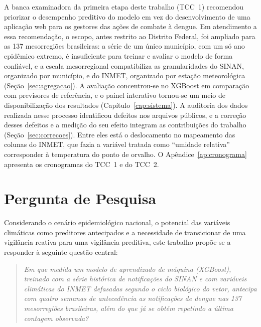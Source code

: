 A banca examinadora da primeira etapa deste trabalho (TCC~1) recomendou priorizar o desempenho preditivo do modelo em vez do desenvolvimento de uma aplicação web para os gestores das ações de combate à dengue. Em atendimento a essa recomendação, o escopo, antes restrito ao Distrito Federal, foi ampliado para as 137 mesorregiões brasileiras: a série de um único município, com um só ano epidêmico extremo, é insuficiente para treinar e avaliar o modelo de forma confiável, e a escala mesorregional compatibiliza as granularidades do SINAN, organizado por município, e do INMET, organizado por estação meteorológica (Seção~\ref{sec:agregacao}). A avaliação concentrou-se no XGBoost em comparação com previsores de referência, e o painel interativo tornou-se um meio de disponibilização dos resultados (Capítulo~\ref{cap:sistema}). A auditoria dos dados realizada nesse processo identificou defeitos nos arquivos públicos, e a correção desses defeitos e a medição do seu efeito integram as contribuições do trabalho (Seção~\ref{sec:correcoes}). Entre eles está o deslocamento no mapeamento das colunas do INMET, que fazia a variável tratada como ``umidade relativa'' corresponder à temperatura do ponto de orvalho. O Apêndice~\ref{ap:cronograma} apresenta os cronogramas do TCC~1 e do TCC~2.

\section{Pergunta de Pesquisa}

Considerando o cenário epidemiológico nacional, o potencial das variáveis climáticas como preditores antecipados e a necessidade de transicionar de uma vigilância reativa para uma vigilância preditiva, este trabalho propõe-se a responder à seguinte questão central:

\begin{quote}
\textit{Em que medida um modelo de aprendizado de máquina (XGBoost), treinado com a série histórica de notificações do SINAN e com variáveis climáticas do INMET defasadas segundo o ciclo biológico do vetor, antecipa com quatro semanas de antecedência as notificações de dengue nas 137 mesorregiões brasileiras, além do que já se obtém repetindo a última contagem observada?}
\end{quote}

